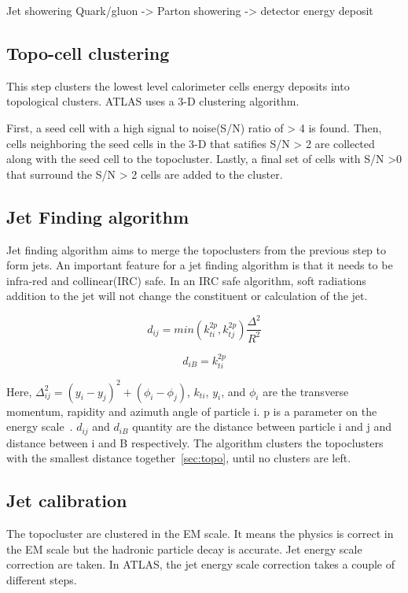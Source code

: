 Jet showering 
Quark/gluon -> Parton showering -> detector energy deposit

% 
\subsection*{Topo-cell clustering}
\label{Topocell clustering}
This step clusters the lowest level calorimeter cells energy deposits into topological clusters. ATLAS uses a 3-D clustering algorithm. 

First, a seed cell with a high signal to noise(S/N) ratio of > 4 is found. Then, cells neighboring the seed cells in the 3-D that satifies S/N > 2 are collected along with the seed cell to the topocluster. Lastly, a final set of cells with S/N >0 that surround the S/N > 2 cells are added to the cluster. 

\subsection*{Jet Finding algorithm}
\label{sec:JetFinding}
Jet finding algorithm aims to merge the topoclusters from the previous step to form jets. An important feature for a jet finding algorithm is that it needs to be infra-red and collinear(IRC) safe. In an IRC safe algorithm, soft radiations addition to the jet will not change the constituent or calculation of the jet. 

\begin{equation}
    d_{ij} = min(k_{ti}^{2p}, k_{tj}^{2p}) \frac{\Delta^{2}}{R^{2}}
    \label{sec:topo}
\end{equation}

\begin{equation}
    d_{iB} = k^{2p}_{ti}
\end{equation}

Here, $\Delta_{ij}^{2} = (y_{i}- y_{j})^2 + (\phi_{i} - \phi_{j})$, $k_{ti}
$, $y_{i}$, and $\phi_{i}$ are the transverse momentum, rapidity and azimuth angle of particle i. p is a parameter on the energy scale~\cite{HEP2008}. $d_{ij}$ and $d_{iB}$ quantity are the distance between particle i and j and distance between i and B respectively. The algorithm clusters the topoclusters with the smallest distance together~\ref{sec:topo}, until no clusters are left. 

\subsection{Jet calibration}
The topocluster are clustered in the EM scale. It means the physics is correct in the EM scale but the hadronic particle decay is accurate. Jet energy scale correction are taken. In ATLAS, the jet energy scale correction takes a couple of different steps.

